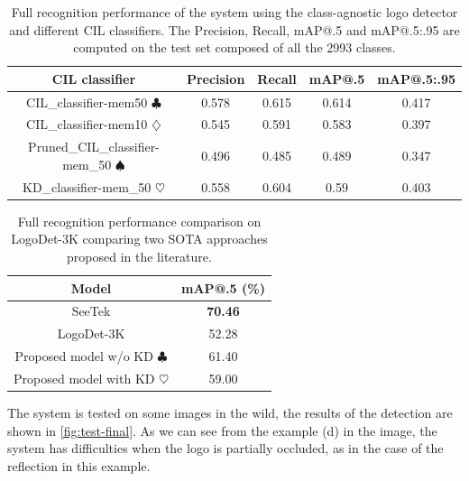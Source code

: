 \begin{table}[H]
    \centering
    \begin{tabular}{c|c|c|c|c}
        \hline
        \textbf{CIL classifier} &
        \textbf{Precision} &
        \textbf{Recall} &
        \textbf{mAP@.5} &
        \textbf{mAP@.5:.95} \\
        \hline
        \hline
CIL\_classifier-mem50 $\clubsuit$&0.578&0.615&0.614&0.417\\
CIL\_classifier-mem10 $\diamondsuit$&0.545&0.591&0.583&0.397\\
Pruned\_CIL\_classifier-mem\_50 $\spadesuit$&0.496&0.485&0.489&0.347\\
KD\_classifier-mem\_50 $\heartsuit$&0.558&0.604&0.59&0.403\\
\hline
\end{tabular}
\caption{Full recognition performance of the system using the class-agnostic logo detector and different CIL classifiers. The Precision, Recall, mAP@.5 and mAP@.5:.95 are computed on the test set composed of all the 2993 classes.}
    \label{table:exp-end2end}
\end{table}


\begin{table}[H]
    \centering
    \begin{tabular}{c|c}
        \hline
        \textbf{Model} &
        \textbf{mAP@.5 (\%)}\\
        \hline
        \hline
SeeTek \cite{li2022seetek}&\textbf{70.46}\\
LogoDet-3K \cite{wang2022logodet}&52.28\\
\hline
Proposed model w/o KD $\clubsuit$&61.40\\
Proposed model with KD $\heartsuit$&59.00\\
\hline
\end{tabular}
\caption{Full recognition performance comparison on LogoDet-3K comparing two SOTA approaches proposed in the literature.}
    \label{table:exp-end2end-sota}
\end{table}

The system is tested on some images in the wild, the results of the detection are shown in \autoref{fig:test-final}. As we can see from the example (d) in the image, the system has difficulties when the logo is partially occluded, as in the case of the reflection in this example.

